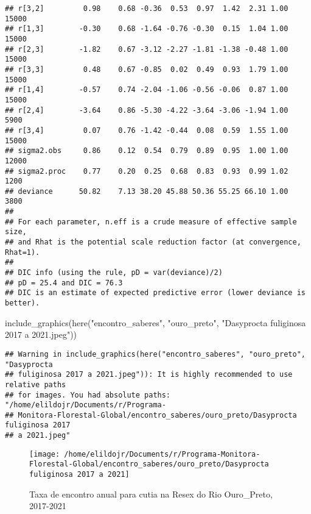 \documentclass[]{tufte-handout}
\newenvironment{Shaded}{}{}
\newcommand{\FunctionTok}[1]{\textcolor[rgb]{0.02,0.16,0.49}{#1}}
\newcommand{\NormalTok}[1]{#1}
\newcommand{\StringTok}[1]{\textcolor[rgb]{0.25,0.44,0.63}{#1}}
\begin{document}
\begin{verbatim}
## r[3,2]         0.98    0.68 -0.36  0.53  0.97  1.42  2.31 1.00 15000
## r[1,3]        -0.30    0.68 -1.64 -0.76 -0.30  0.15  1.04 1.00 15000
## r[2,3]        -1.82    0.67 -3.12 -2.27 -1.81 -1.38 -0.48 1.00 15000
## r[3,3]         0.48    0.67 -0.85  0.02  0.49  0.93  1.79 1.00 15000
## r[1,4]        -0.57    0.74 -2.04 -1.06 -0.56 -0.06  0.87 1.00 15000
## r[2,4]        -3.64    0.86 -5.30 -4.22 -3.64 -3.06 -1.94 1.00  5900
## r[3,4]         0.07    0.76 -1.42 -0.44  0.08  0.59  1.55 1.00 15000
## sigma2.obs     0.86    0.12  0.54  0.79  0.89  0.95  1.00 1.00 12000
## sigma2.proc    0.77    0.20  0.25  0.68  0.83  0.93  0.99 1.02  1200
## deviance      50.82    7.13 38.20 45.88 50.36 55.25 66.10 1.00  3800
## 
## For each parameter, n.eff is a crude measure of effective sample size,
## and Rhat is the potential scale reduction factor (at convergence, Rhat=1).
## 
## DIC info (using the rule, pD = var(deviance)/2)
## pD = 25.4 and DIC = 76.3
## DIC is an estimate of expected predictive error (lower deviance is better).
\end{verbatim}

\begin{Shaded}
\begin{Highlighting}[]
\FunctionTok{include\_graphics}\NormalTok{(}\FunctionTok{here}\NormalTok{(}\StringTok{"encontro\_saberes"}\NormalTok{, }\StringTok{"ouro\_preto"}\NormalTok{, }\StringTok{"Dasyprocta fuliginosa 2017 a 2021.jpeg"}\NormalTok{))}
\end{Highlighting}
\end{Shaded}

\begin{verbatim}
## Warning in include_graphics(here("encontro_saberes", "ouro_preto", "Dasyprocta
## fuliginosa 2017 a 2021.jpeg")): It is highly recommended to use relative paths
## for images. You had absolute paths: "/home/elildojr/Documents/r/Programa-
## Monitora-Florestal-Global/encontro_saberes/ouro_preto/Dasyprocta fuliginosa 2017
## a 2021.jpeg"
\end{verbatim}

\begin{figure}
\texttt{[image: /home/elildojr/Documents/r/Programa-Monitora-Florestal-Global/encontro\_saberes/ouro\_preto/Dasyprocta fuliginosa 2017 a 2021]} \caption[Taxa de encontro anual para cutia na Resex do Rio Ouro_Preto, 2017-2021]{Taxa de encontro anual para cutia na Resex do Rio Ouro_Preto, 2017-2021}\label{fig:unnamed-chunk-6}
\end{figure}
\end{document}
